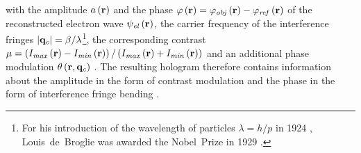 with the amplitude $a\left(\vb{r}\right)$ and the phase $\varphi\left(\vb{r}\right) = {\varphi}_{\mathit{obj}}\left(\vb{r}\right) - {\varphi}_{\mathit{ref}}\left(\vb{r}\right)$ of the reconstructed electron wave ${\psi}_{\mathit{el}}\left(\vb{r}\right)$, the carrier frequency of the interference fringes $\abs{\vb{q}_c} = {\beta}/{\lambda}$\footnote{For his introduction of the wavelength of particles $\lambda = h / p$ in 1924 \cite{BrogliePhD1924}, Louis~de~Broglie was awarded the Nobel~Prize in 1929 \cite{Broglie1929}.}, the corresponding contrast $\mu = \left(I_{\mathit{max}}\left(\vb{r}\right) - I_{\mathit{min}}\left(\vb{r}\right)\right) / \left(I_{\mathit{max}}\left(\vb{r}\right) + I_{\mathit{min}}\left(\vb{r}\right)\right)$ \cite{Voelkl1999,Lehmann2002,Lichte2008} and an additional phase modulation $\theta\left(\vb{r}, \vb{q}_c\right)$ \cite{LehmannPhD1997}. The resulting hologram therefore contains information about the amplitude in the form of contrast modulation and the phase in the form of interference fringe bending \cite{Voelkl1999,Lehmann2002,Lichte2008}.

